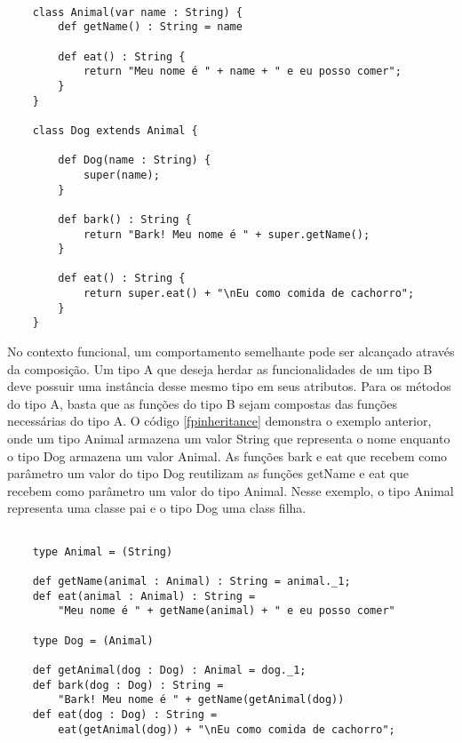 \begin{lstlisting}[caption={Herança em Orientação a Objetos},label=ooinheritance]
    
    class Animal(var name : String) {
        def getName() : String = name
        
        def eat() : String {
            return "Meu nome é " + name + " e eu posso comer";
        }
    }

    class Dog extends Animal {
        
        def Dog(name : String) {
            super(name);
        }

        def bark() : String {
            return "Bark! Meu nome é " + super.getName();
        }

        def eat() : String {
            return super.eat() + "\nEu como comida de cachorro";
        }
    }

\end{lstlisting}

No contexto funcional, um comportamento semelhante 
pode ser alcançado através da composição. Um tipo A 
que deseja herdar as funcionalidades de um tipo B 
deve possuir uma instância desse mesmo tipo em seus 
atributos. Para os métodos do tipo A, basta que as 
funções do tipo B sejam compostas das funções 
necessárias do tipo A. O código \ref{fpinheritance} 
demonstra o exemplo anterior, onde um tipo Animal 
armazena um valor String que representa o nome 
enquanto o tipo Dog armazena um valor Animal. 
As funções bark e eat que recebem como parâmetro 
um valor do tipo Dog reutilizam as funções getName 
e eat que recebem como parâmetro um valor do tipo 
Animal. Nesse exemplo, o tipo Animal representa 
uma classe pai e o tipo Dog uma class filha.

\begin{lstlisting}[caption={Herança em Programação Funcional},label=fpinheritance]
    
    type Animal = (String)

    def getName(animal : Animal) : String = animal._1;
    def eat(animal : Animal) : String = 
        "Meu nome é " + getName(animal) + " e eu posso comer"

    type Dog = (Animal)

    def getAnimal(dog : Dog) : Animal = dog._1;
    def bark(dog : Dog) : String = 
        "Bark! Meu nome é " + getName(getAnimal(dog))
    def eat(dog : Dog) : String = 
        eat(getAnimal(dog)) + "\nEu como comida de cachorro";

\end{lstlisting}

